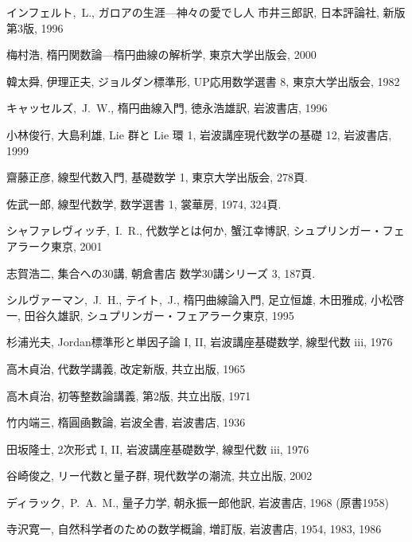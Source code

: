 \documentclass[12pt,twoside]{jarticle}
\begin{document}
\begin{thebibliography}{ABCD}

インフェルト,~L.,
ガロアの生涯—神々の愛でし人
市井三郎訳, 
日本評論社, 新版第3版, 1996

梅村浩, 楕円関数論---楕円曲線の解析学, 東京大学出版会, 2000

韓太舜, 伊理正夫, ジョルダン標準形, UP応用数学選書 8, 東京大学出版会, 1982

キャッセルズ,~J.~W., 楕円曲線入門, 徳永浩雄訳, 岩波書店, 1996

小林俊行, 大島利雄, Lie 群と Lie 環 1, 岩波講座現代数学の基礎 12,
岩波書店, 1999

齋藤正彦, 線型代数入門, 基礎数学 1, 東京大学出版会, 278頁.

佐武一郎, 線型代数学, 数学選書 1, 裳華房, 1974, 324頁.

シャファレヴィッチ,~I.~R., 代数学とは何か, 蟹江幸博訳, シュプリンガー・フェ
アラーク東京, 2001

志賀浩二, 集合への30講, 朝倉書店 数学30講シリーズ 3, 187頁.

シルヴァーマン,~J.~H., テイト,~J., 楕円曲線論入門, 
足立恒雄, 木田雅成, 小松啓一, 田谷久雄訳, 
シュプリンガー・フェアラーク東京, 1995

杉浦光夫, Jordan標準形と単因子論 I, II, 岩波講座基礎数学, 線型代数 iii, 1976

高木貞治, 代数学講義, 改定新版, 共立出版, 1965

高木貞治, 初等整数論講義, 第2版, 共立出版, 1971

竹内端三, 楕圓凾數論, 岩波全書, 岩波書店, 1936

田坂隆士, 2次形式 I, II, 岩波講座基礎数学, 線型代数 iii, 1976

谷崎俊之, リー代数と量子群, 現代数学の潮流, 共立出版, 2002

ディラック,~P.~A.~M., 量子力学, %
朝永振一郎他訳, 岩波書店, 1968 (原書1958)

寺沢寛一, 自然科学者のための数学概論, 増訂版, 岩波書店, 1954, 1983, 1986


\end{thebibliography}
\end{document}
